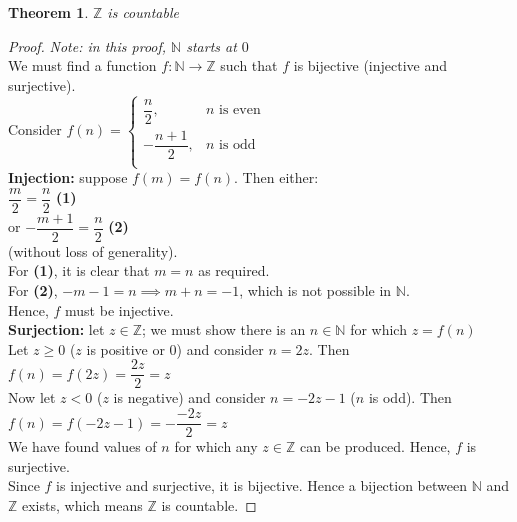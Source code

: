 \documentclass[12pt, a4paper, titlepage, twoside]{article}
\newcommand*{\N}{\mathbb{N}}
\newcommand*{\Z}{\mathbb{Z}}
\newtheorem*{theorem*}{Theorem}
\begin{document}
	\hfill
	
	\begin{pf}
		\label{pf:z-count}
		\begin{theorem*}
			$\Z$ is countable
		\end{theorem*}

		\tcbline		
		
		\begin{proof}
			\textit{Note: in this proof, $\N$ starts at $0$}\\
			
			We must find a function $f: \N \to \Z$ such that $f$ is bijective (injective and surjective).\\
			
			Consider $f(n) = 
			\begin{cases} 
				\dfrac{n}{2}, & n \text{ is even}\\
				-\dfrac{n+1}{2}, & n \text{ is odd}\\
			\end{cases}$\\
			
			\textbf{Injection:} suppose $f(m) = f(n)$. Then either:\\ 
			
			$\dfrac{m}{2} = \dfrac{n}{2}$ \hfill \textbf{(1)}\\ 
			
			or $-\dfrac{m+1}{2} = \dfrac{n}{2}$ \hfill \textbf{(2)}\\
			
			(without loss of generality).\\
			
			For \textbf{(1)}, it is clear that $m=n$ as required.\\
			For \textbf{(2)}, $-m-1 = n \implies m+n = -1$, which is not possible in $\N$.\\
			
			Hence, $f$ must be injective.\\
			
			\textbf{Surjection:} let $z \in \Z$; we must show there is an $n \in \N$ for which $z = f(n)$\\
			
			Let $z \geq 0$ ($z$ is positive or 0) and consider $n = 2z$. Then $f(n) = f(2z) = \dfrac{2z}{2} = z$\\
			
			Now let $z < 0$ ($z$ is negative) and consider $n = -2z-1$ ($n$ is odd). Then $f(n) = f(-2z-1) = -\dfrac{-2z}{2} = z$\\
			
			We have found values of $n$ for which any $z \in \Z$ can be produced. Hence, $f$ is surjective.\\
			
			Since $f$ is injective and surjective, it is bijective. Hence a bijection between $\N$ and $\Z$ exists, which means
			$\Z$ is countable. 
		\end{proof}
	\end{pf}
	
\end{document}
